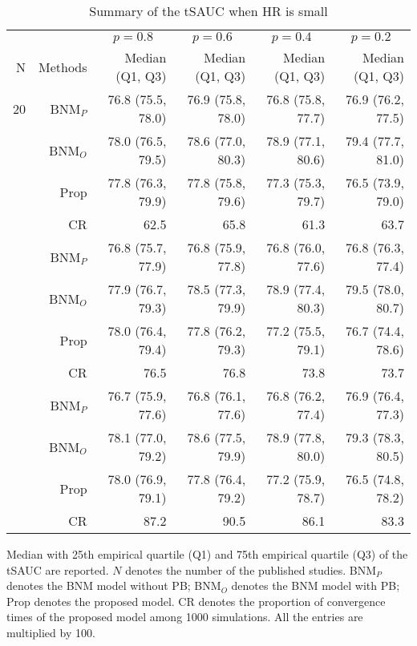\begin{table}[!htb]

\caption{\label{tab:sauc.med.1}Summary of the tSAUC when HR is small}
\centering
\begin{threeparttable}
\begin{tabular}[t]{rrrrrr}
\toprule
\multicolumn{1}{c}{} & \multicolumn{1}{c}{} & \multicolumn{1}{c}{$p = 0.8$} & \multicolumn{1}{c}{$p = 0.6$} & \multicolumn{1}{c}{$p = 0.4$} & \multicolumn{1}{c}{$p = 0.2$} \\
\cmidrule(l{3pt}r{3pt}){3-3} \cmidrule(l{3pt}r{3pt}){4-4} \cmidrule(l{3pt}r{3pt}){5-5} \cmidrule(l{3pt}r{3pt}){6-6}
N & Methods & Median (Q1, Q3) & Median (Q1, Q3) & Median (Q1, Q3) & Median (Q1, Q3)\\
\midrule
20 & BNM$_P$ & 76.8 (75.5, 78.0) & 76.9 (75.8, 78.0) & 76.8 (75.8, 77.7) & 76.9 (76.2, 77.5)\\
 & BNM$_O$ & 78.0 (76.5, 79.5) & 78.6 (77.0, 80.3) & 78.9 (77.1, 80.6) & 79.4 (77.7, 81.0)\\
 & Prop & 77.8 (76.3, 79.9) & 77.8 (75.8, 79.6) & 77.3 (75.3, 79.7) & 76.5 (73.9, 79.0)\\
 & CR & 62.5 & 65.8 & 61.3 & 63.7\\
\addlinespace
30 & BNM$_P$ & 76.8 (75.7, 77.9) & 76.8 (75.9, 77.8) & 76.8 (76.0, 77.6) & 76.8 (76.3, 77.4)\\
 & BNM$_O$ & 77.9 (76.7, 79.3) & 78.5 (77.3, 79.9) & 78.9 (77.4, 80.3) & 79.5 (78.0, 80.7)\\
 & Prop & 78.0 (76.4, 79.4) & 77.8 (76.2, 79.3) & 77.2 (75.5, 79.1) & 76.7 (74.4, 78.6)\\
 & CR & 76.5 & 76.8 & 73.8 & 73.7\\
\addlinespace
50 & BNM$_P$ & 76.7 (75.9, 77.6) & 76.8 (76.1, 77.6) & 76.8 (76.2, 77.4) & 76.9 (76.4, 77.3)\\
 & BNM$_O$ & 78.1 (77.0, 79.2) & 78.6 (77.5, 79.9) & 78.9 (77.8, 80.0) & 79.3 (78.3, 80.5)\\
 & Prop & 78.0 (76.9, 79.1) & 77.8 (76.4, 79.2) & 77.2 (75.9, 78.7) & 76.5 (74.8, 78.2)\\
 & CR & 87.2 & 90.5 & 86.1 & 83.3\\
\bottomrule
\end{tabular}
\begin{tablenotes}
\item 
Median with 25th empirical quartile (Q1) and 75th empirical quartile (Q3) of the tSAUC are reported. 
$N$ denotes the number of the published studies. 
BNM$_P$ denotes the BNM model without PB; 
BNM$_O$ denotes the BNM model with PB;
Prop denotes the proposed model.
CR denotes the proportion of convergence times of the proposed model among 1000 simulations.
All the entries are multiplied by 100.
\end{tablenotes}
\end{threeparttable}
\end{table}
